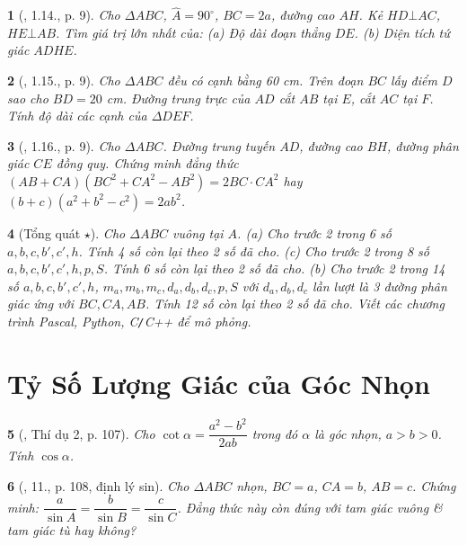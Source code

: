\documentclass{article}
\newtheorem{baitoan}{}
\begin{document}
\begin{baitoan}[\cite{TLCT_THCS_Toan_9_hinh_hoc}, 1.14., p. 9]
	Cho $\Delta ABC$, $\widehat{A} = 90^\circ$, $BC = 2a$, đường cao $AH$. Kẻ $HD\bot AC$, $HE\bot AB$. Tìm giá trị lớn nhất của: (a) Độ dài đoạn thẳng $DE$. (b) Diện tích tứ giác $ADHE$.
\end{baitoan}

\begin{baitoan}[\cite{TLCT_THCS_Toan_9_hinh_hoc}, 1.15., p. 9]
	Cho $\Delta ABC$ đều có cạnh bằng {\rm60 cm}. Trên đoạn $BC$ lấy điểm $D$ sao cho $BD = 20$ {\rm cm}. Đường trung trực của $AD$ cắt $AB$ tại $E$, cắt $AC$ tại $F$. Tính độ dài các cạnh của $\Delta DEF$.
\end{baitoan}

\begin{baitoan}[\cite{TLCT_THCS_Toan_9_hinh_hoc}, 1.16., p. 9]
	Cho $\Delta ABC$. Đường trung tuyến $AD$, đường cao $BH$, đường phân giác $CE$ đồng quy. Chứng minh đẳng thức $(AB + CA)(BC^2 + CA^2 - AB^2) = 2BC\cdot CA^2$ hay $(b + c)(a^2 + b^2 - c^2) = 2ab^2$.
\end{baitoan}

\begin{baitoan}[Tổng quát $\star$]
	Cho $\Delta ABC$ vuông tại $A$. (a) Cho trước 2 trong 6 số $a,b,c,b',c',h$. Tính 4 số còn lại theo 2 số đã cho. (c) Cho trước 2 trong 8 số $a,b,c,b',c',h,p,S$. Tính 6 số còn lại theo 2 số đã cho. (b) Cho trước 2 trong 14 số $a,b,c,b',c',h$, $m_a,m_b,m_c,d_a,d_b,d_c,p,S$ với $d_a,d_b,d_c$ lần lượt là 3 đường phân giác ứng với $BC,CA,AB$. Tính 12 số còn lại theo 2 số đã cho. Viết các chương trình {\sf Pascal, Python, C{\tt/}C++} để mô phỏng.
\end{baitoan}


\section{Tỷ Số Lượng Giác của Góc Nhọn}

\begin{baitoan}[\cite{Tuyen_Toan_9_old}, Thí dụ 2, p. 107]
	Cho $\cot\alpha = \dfrac{a^2 - b^2}{2ab}$ trong đó $\alpha$ là góc nhọn, $a > b > 0$. Tính $\cos\alpha$.
\end{baitoan}

\begin{baitoan}[\cite{Tuyen_Toan_9_old}, 11., p. 108, định lý sin]
	Cho $\Delta ABC$ nhọn, $BC = a$, $CA = b$, $AB = c$. Chứng minh: $\dfrac{a}{\sin A} = \dfrac{b}{\sin B} = \dfrac{c}{\sin C}$. Đẳng thức này còn đúng với tam giác vuông \& tam giác tù hay không?
\end{baitoan}
\end{document}
